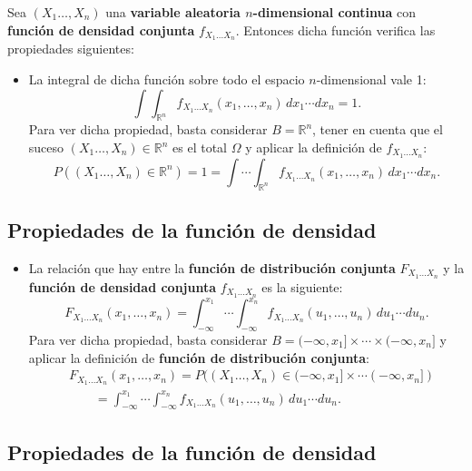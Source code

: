 \documentclass[]{book}
\providecommand{\tightlist}{%
  \setlength{\itemsep}{0pt}\setlength{\parskip}{0pt}}
\begin{document}
Sea \((X_1\ldots,X_n)\) una \textbf{variable aleatoria \(n\)-dimensional continua} con \textbf{función de densidad conjunta} \(f_{X_1\ldots X_n}\). Entonces dicha función verifica las propiedades siguientes:

\begin{itemize}
\tightlist
\item
  La integral de dicha función sobre todo el espacio \(n\)-dimensional vale 1:
  \[
  \int\int_{\mathbb{R}^n} f_{X_1\ldots X_n}(x_1,\ldots,x_n)\,dx_1\cdots dx_n =1.
  \]
  Para ver dicha propiedad, basta considerar \(B=\mathbb{R}^n\), tener en cuenta que el suceso \((X_1\ldots,X_n)\in \mathbb{R}^n\) es el total \(\Omega\) y aplicar la definición de \(f_{X_1\ldots X_n}\):
  \[
  P((X_1\ldots,X_n)\in \mathbb{R}^n)=1= \int\cdots\int_{\mathbb{R}^n} f_{X_1\ldots X_n}(x_1,\ldots,x_n)\,dx_1\cdots dx_n.
  \]
\end{itemize}

\hypertarget{propiedades-de-la-funciuxf3n-de-densidad-4}{%
\subsection{Propiedades de la función de densidad}\label{propiedades-de-la-funciuxf3n-de-densidad-4}}

\begin{itemize}
\tightlist
\item
  La relación que hay entre la \textbf{función de distribución conjunta} \(F_{X_1\ldots X_n}\) y la \textbf{función de densidad conjunta} \(f_{X_1\ldots X_n}\) es la siguiente:
  \[
  F_{X_1\ldots X_n}(x_1,\ldots,x_n)=\int_{-\infty}^{x_1}\cdots\int_{-\infty}^{x_n} f_{X_1\ldots X_n}(u_1,\ldots,u_n)\,du_1\cdots du_n.
  \]
  Para ver dicha propiedad, basta considerar \(B=(-\infty,x_1]\times\cdots\times (-\infty,x_n]\) y aplicar la definición de \textbf{función de distribución conjunta}:
  \[
  \begin{array}{rl}
  & F_{X_1\ldots X_n}(x_1,\ldots,x_n)=P((X_1\ldots,X_n)\in (-\infty,x_1]\times\cdots (-\infty,x_n])\\ &\qquad =\int_{-\infty}^{x_1}\cdots\int_{-\infty}^{x_n} f_{X_1\ldots X_n}(u_1,\ldots,u_n)\,du_1\cdots du_n.
  \end{array}
  \]
\end{itemize}

\hypertarget{propiedades-de-la-funciuxf3n-de-densidad-5}{%
\subsection{Propiedades de la función de densidad}\label{propiedades-de-la-funciuxf3n-de-densidad-5}}
\end{document}
